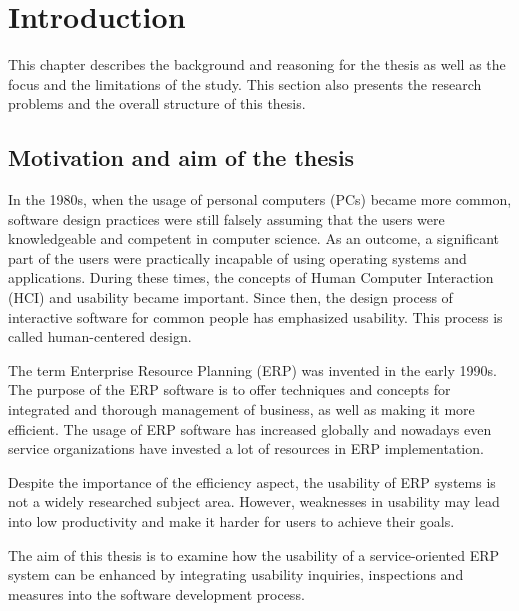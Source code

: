 \documentclass[12pt,a4paper,oneside,pdftex]{report}
\begin{document}
\pagestyle{headings}


% 

\chapter{Introduction}
\label{chapter:introduction}
This chapter describes the background and reasoning for the thesis as well as the focus and the limitations of the study. This section also presents the research problems and the overall structure of this thesis. 

\section{Motivation and aim of the thesis}
\label{sec:motivationandaim}
In the 1980s, when the usage of personal computers (PCs) became more common, software design practices were still falsely assuming that the users were knowledgeable and competent in computer science. As an outcome, a significant part of the users were practically incapable of using operating systems and applications.
During these times, the concepts of Human Computer Interaction (HCI) and usability became important. Since then, the design process of interactive software for common people has emphasized usability. This process is called human-centered design. \cite{RefWorks:9}

The term Enterprise Resource Planning (ERP) was invented in the early 1990s.\cite{RefWorks:3} The purpose of the ERP software is to offer techniques and concepts for integrated and thorough management of business, as well as making it more efficient.
The usage of ERP software has increased globally and nowadays even service organizations have invested a lot of resources in ERP implementation.\cite{RefWorks:1, RefWorks:7} 

Despite the importance of the efficiency aspect, the usability of ERP systems is not a widely researched subject area. However, weaknesses in usability may lead into low productivity and make it harder for users to achieve their goals.\cite{RefWorks:2} 

The aim of this thesis is to examine how the usability of a service-oriented ERP system can be enhanced by integrating usability inquiries, inspections and measures into the software development process. 
\end{document}
